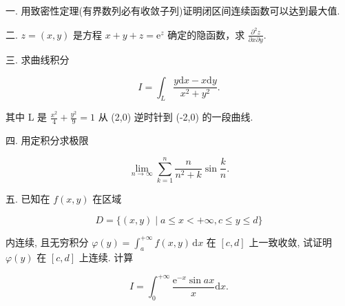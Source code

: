 \documentclass{examcollection}
\renewcommand{\displayformula}[1]{\[#1\]}
\begin{document}
{\begin{minipage}{\textwidth}
一. 用致密性定理(有界数列必有收敛子列)证明闭区间连续函数可以达到最大值.\par
二. $z = (x,y)$ 是方程 $x + y + z = \mathrm{e}^z$ 确定的隐函数，求 $\frac{\partial^2z}{\partial x\partial y}$.\par
三. 求曲线积分\par
\displayformula{I = \int_ {L} \frac {y \mathrm{d} x - x \mathrm{d} y}{x ^ {2} + y ^ {2}}.}\par
其中 L 是  $\frac{x^{2}}{4} + \frac{y^{2}}{9} = 1$  从 (2,0) 逆时针到 (-2,0) 的一段曲线.\par
四. 用定积分求极限\par
\displayformula{\lim _ {n \to \infty} \sum_ {k = 1} ^ {n} \frac {n}{n ^ {2} + k} \sin \frac {k}{n}.}\par
五. 已知在 $f(x, y)$ 在区域\par
\displayformula{D = \{(x, y) \mid a \leq x <   + \infty , c \leq y \leq d \}}\par
内连续, 且无穷积分 $\varphi(y) = \int_{a}^{+\infty} f(x, y) \, \mathrm{d}x$ 在 $[c, d]$ 上一致收敛, 试证明 $\varphi(y)$ 在 $[c, d]$ 上连续.
计算\par
\displayformula{I = \int_ {0} ^ {+ \infty} \frac {\mathrm{e} ^ {- x} \sin a x}{x} \mathrm{d} x.}\par
\end{minipage}}
\ifdim\dimexpr\ht\proofbox+\dp\proofbox\relax>\textheight
\noindent\resizebox{!}{\textheight}{\usebox{\proofbox}}\else\noindent\usebox{\proofbox}\fi\clearpage
\end{document}
